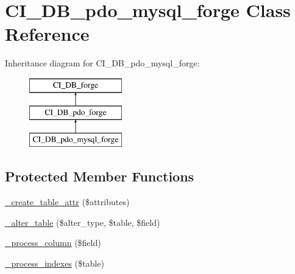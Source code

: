 \hypertarget{class_c_i___d_b__pdo__mysql__forge}{}\section{C\+I\+\_\+\+D\+B\+\_\+pdo\+\_\+mysql\+\_\+forge Class Reference}
\label{class_c_i___d_b__pdo__mysql__forge}
Inheritance diagram for C\+I\+\_\+\+D\+B\+\_\+pdo\+\_\+mysql\+\_\+forge\+:\begin{figure}[H]
\begin{center}
\leavevmode
\includegraphics[height=3.000000cm]{class_c_i___d_b__pdo__mysql__forge}
\end{center}
\end{figure}
\subsection*{Protected Member Functions}
\begin{DoxyCompactItemize}
\item 
\mbox{\hyperlink{class_c_i___d_b__pdo__mysql__forge_a10b25326d82f6ddd9af1935e52e42b72}{\+\_\+create\+\_\+table\+\_\+attr}} (\$attributes)
\item 
\mbox{\hyperlink{class_c_i___d_b__pdo__mysql__forge_a41c6cae02f2fda8b429ad0afb9509426}{\+\_\+alter\+\_\+table}} (\$alter\+\_\+type, \$table, \$field)
\item 
\mbox{\hyperlink{class_c_i___d_b__pdo__mysql__forge_a8f38f1c5b5dddecca4befbe393f3f299}{\+\_\+process\+\_\+column}} (\$field)
\item 
\mbox{\hyperlink{class_c_i___d_b__pdo__mysql__forge_ae0bdb4ea3418590d1894c5b621b5ca50}{\+\_\+process\+\_\+indexes}} (\$table)
\end{DoxyCompactItemize}
